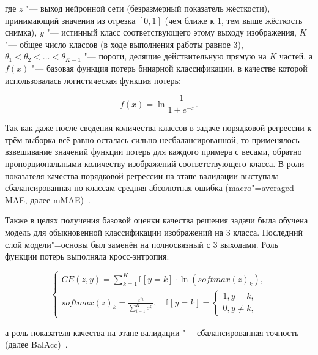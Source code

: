 \noindent где $z$ "--- выход нейронной сети (безразмерный показатель жёсткости), принимающий значения из отрезка $\left[ 0, 1 \right]$ (чем ближе к $1$, тем выше жёсткость снимка), $y$ "--- истинный класс соответствующего этому выходу изображения, $K$ "--- общее число классов (в ходе выполнения работы равное 3), $\theta_1 < \theta_2 < \ldots < \theta_{K-1}$ "--- пороги, делящие действительную прямую на $K$ частей, а $f(x)$ "--- базовая функция потерь бинарной классификации, в качестве которой использовалась логистическая функция потерь:

\begin{equation}
	f \left( x \right) = \ln{\frac{1}{1+e^{-x}}}. \nonumber
\end{equation}

Так как даже после сведения количества классов в задаче порядковой регрессии к трём выборка всё равно осталась сильно несбалансированной, то применялось взвешивание значений функции потерь для каждого примера с весами, обратно пропорциональными количеству изображений соответствующего класса. В роли показателя качества порядковой регрессии на этапе валидации выступала сбалансированная по классам средняя абсолютная ошибка (macro"=averaged MAE, далее mMAE)~\cite{baccianella2009evaluation}.

Также в целях получения базовой оценки качества решения задачи была обучена модель для обыкновенной классификации изображений на 3 класса. Последний слой модели"=основы был заменён на полносвязный с 3 выходами. Роль функции потерь выполняла кросс-энтропия:

\begin{equation}
	\begin{cases}
		CE \left( z,y \right) = \sum_{k=1}^{K}{\mathbb{I} \left[ y = k \right] \cdot \ln{\left( softmax \left( z \right)_k \right)}}, \\
		softmax \left( z \right)_k = \frac{e^{z_k}}{\sum_{i=1}^{K}e^{z_i}},\quad \mathbb{I} \left[ y = k \right] =
		\begin{cases}
			1, y = k, \\
			0, y \neq k,
		\end{cases}
	\end{cases} \nonumber
\end{equation}

\noindent а роль показателя качества на этапе валидации "--- сбалансированная точность (далее BalAcc)~\cite{brodersen2010balanced}.

